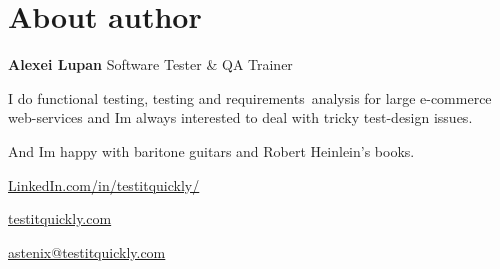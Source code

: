\section*{About author}
\label{sec:About author}

\begin{minipage}{0.45\textwidth}

\Huge \textbf{Alexei Lupan} \newline
\normalsize Software Tester \& QA Trainer 

\bigskip

\begin{flushleft}
I do functional testing, testing and \mbox{requirements analysis} for large e-commerce web-services  and I\textquotesingle m always interested to deal with tricky test-design issues.
\end{flushleft}

And I\textquotesingle m happy with baritone guitars and Robert Heinlein's books.

\bigskip

\href{https://www.linkedin.com/in/testitquickly/}{LinkedIn.com/in/testitquickly/} 

\href{https://testitquickly.com/}{testitquickly.com}
 
\href{mailto:astenix@testitquickly.com}{astenix@testitquickly.com} 

\end{minipage} %
\begin{minipage}{0.3\textwidth} %
\end{minipage}
